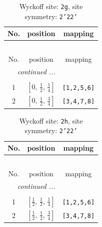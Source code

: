 \documentclass[fleqn,8pt]{jsarticle}
\begin{document}
\begin{longtable}{ccc}
\caption{Wyckoff site: {\tt 2g}, site symmetry: {\tt 2'22'}}
 \\
 \hline \hline
No. & position & mapping \\ \hline \endfirsthead

\multicolumn{2}{l}{\tablename\ \thetable{}} \\
 \hline \hline
No. & position & mapping \\ \hline \endhead

 \hline \hline
\multicolumn{2}{r}{\footnotesize\it continued ...} \\ \endfoot

 \hline \hline
\multicolumn{2}{r}{} \\ \endlastfoot

1 & $\left[ 0,\, \frac{1}{2},\, \frac{1}{4} \right]$ & {\tt [1,2,5,6]} \\ \hline
2 & $\left[ 0,\, \frac{1}{2},\, \frac{3}{4} \right]$ & {\tt [3,4,7,8]} \\
\end{longtable}
\renewcommand{\arraystretch}{1.2}
\begin{longtable}{ccc}
\caption{Wyckoff site: {\tt 2h}, site symmetry: {\tt 2'22'}}
 \\
 \hline \hline
No. & position & mapping \\ \hline \endfirsthead

\multicolumn{2}{l}{\tablename\ \thetable{}} \\
 \hline \hline
No. & position & mapping \\ \hline \endhead

 \hline \hline
\multicolumn{2}{r}{\footnotesize\it continued ...} \\ \endfoot

 \hline \hline
\multicolumn{2}{r}{} \\ \endlastfoot

1 & $\left[ \frac{1}{2},\, \frac{1}{2},\, \frac{1}{4} \right]$ & {\tt [1,2,5,6]} \\ \hline
2 & $\left[ \frac{1}{2},\, \frac{1}{2},\, \frac{3}{4} \right]$ & {\tt [3,4,7,8]} \\
\end{longtable}
\renewcommand{\arraystretch}{1.2}
\end{document}

